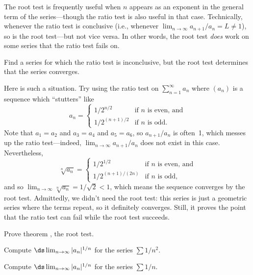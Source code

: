 The root test is frequently useful when $n$ appears as an exponent in
the general term of the series---though the ratio test is also useful
in that case.  Technically, whenever the ratio test is conclusive
(i.e., whenever $\lim_{n\to\infty} a_{n+1} / a_n = L \neq 1$), so is
the root test---but not vice versa.  In other words, the root test
\textit{does} work on some series that the ratio test fails on.

\begin{example}
Find a series for which the ratio test is inconclusive, but the root test determines that the series converges.
\end{example}

\begin{solution}
Here is such a situation.  Try using the ratio test on
$\sum_{n=1}^\infty a_n$ where $(a_n)$ is a sequence which ``stutters''
like
$$
a_n = \begin{cases}
1/2^{n/2} & \mbox{if $n$ is even, and} \\
1/2^{(n+1)/2} & \mbox{if $n$ is odd.} 
\end{cases}
$$
Note that $a_1 = a_2$ and $a_3 = a_4$ and $a_5 = a_6$, so
$a_{n+1}/a_n$ is often~1, which messes up the ratio test---indeed,
$\lim_{n \to \infty} a_{n+1}/a_n$ does not exist in this case.
Nevertheless,
$$
\sqrt[n]{a_n} = \begin{cases}
1/2^{1/2} & \mbox{if $n$ is even, and} \\
1/2^{(n+1)/(2n)} & \mbox{if $n$ is odd,} 
\end{cases}
$$
and so $\lim_{n \to\infty} \sqrt[n]{a_n} = 1/\sqrt{2} < 1$, which
means the sequence converges by the root test.  Admittedly, we didn't
need the root test: this series is just a geometric series where the
terms repeat, so it definitely converges.  Still, it proves the point
that the ratio test can fail while the root test succeeds.
\end{solution}

\begin{exercises}
\begin{exercise}
Prove theorem , the root test.\end{exercise}

\begin{exercise} Compute $\ds\lim_{n\to\infty} |a_n|^{1/n}$ for the series
$\sum 1/n^2$.
\end{exercise}

\begin{exercise} Compute $\ds\lim_{n\to\infty} |a_n|^{1/n}$ for the series
$\sum 1/n$.
\end{exercise}

\end{exercises}
